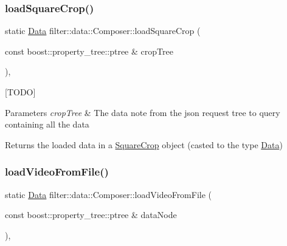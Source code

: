 \subsubsection{\texorpdfstring{load\+Square\+Crop()}{loadSquareCrop()}}
{\footnotesize\ttfamily static \hyperlink{classfilter_1_1data_1_1_data}{Data} filter\+::data\+::\+Composer\+::load\+Square\+Crop (\begin{DoxyParamCaption}\item[{const boost\+::property\+\_\+tree\+::ptree \&}]{crop\+Tree }\end{DoxyParamCaption})\hspace{0.3cm}{\ttfamily [inline]}, {\ttfamily [static]}}

\mbox{[}T\+O\+DO\mbox{]} 
\begin{DoxyParams}{Parameters}
{\em crop\+Tree} & The data note from the json request tree to query containing all the data \\
\hline
\end{DoxyParams}
\begin{DoxyReturn}{Returns}
the loaded data in a \hyperlink{classfilter_1_1data_1_1_square_crop}{Square\+Crop} object (casted to the type \hyperlink{classfilter_1_1data_1_1_data}{Data}) 
\end{DoxyReturn}
\mbox{\label{classfilter_1_1data_1_1_composer_a8f642146a9e50f97ba68afcfcdf9eb7b}} 
\subsubsection{\texorpdfstring{load\+Video\+From\+File()}{loadVideoFromFile()}}
{\footnotesize\ttfamily static \hyperlink{classfilter_1_1data_1_1_data}{Data} filter\+::data\+::\+Composer\+::load\+Video\+From\+File (\begin{DoxyParamCaption}\item[{const boost\+::property\+\_\+tree\+::ptree \&}]{data\+Node }\end{DoxyParamCaption})\hspace{0.3cm}{\ttfamily [inline]}, {\ttfamily [static]}}

